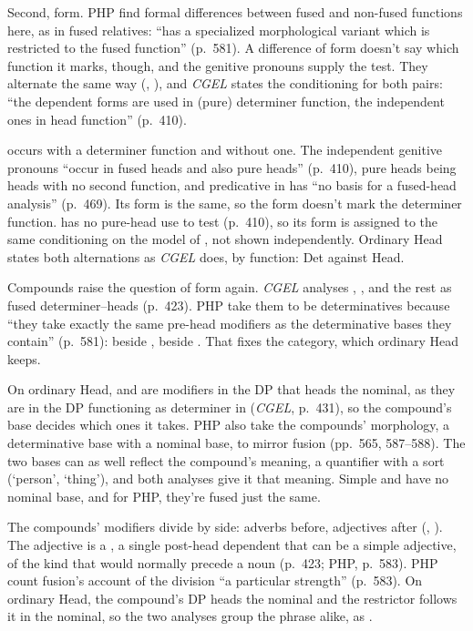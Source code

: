 Second, form. PHP find formal differences between fused and non-fused functions here, as in fused relatives:  \enquote{has a specialized morphological variant  which is restricted to the fused function} (p.~581). A difference of form doesn't say which function it marks, though, and the genitive pronouns supply the test. They alternate the same way (, ), and \textit{CGEL} states the conditioning for both pairs: \enquote{the dependent forms are used in (pure) determiner function, the independent ones in head function} (p.~410).

 occurs with a determiner function and without one. The independent genitive pronouns \enquote{occur in fused heads and also pure heads} (p.~410), pure heads being heads with no second function, and predicative  in  has \enquote{no basis for a fused-head analysis} (p.~469). Its form is the same, so the form doesn't mark the determiner function.  has no pure-head use to test (p.~410), so its form is assigned to the same conditioning on the model of , not shown independently. Ordinary Head states both alternations as \textit{CGEL} does, by function: Det against Head.

Compounds raise the question of form again. \textit{CGEL} analyses , , and the rest as fused determiner--heads (p.~423). PHP take them to be determinatives because \enquote{they take exactly the same pre-head modifiers as the determinative bases they contain} (p.~581):  beside ,  beside . That fixes the category, which ordinary Head keeps.

On ordinary Head,  and  are modifiers in the DP that heads the nominal, as they are in the DP functioning as determiner in  (\textit{CGEL}, p.~431), so the compound's base decides which ones it takes. PHP also take the compounds' morphology, a determinative base with a nominal base, to mirror fusion (pp.~565, 587--588). The two bases can as well reflect the compound's meaning, a quantifier with a sort (\enquote*{person}, \enquote*{thing}), and both analyses give it that meaning. Simple  and  have no nominal base, and for PHP, they're fused just the same.

The compounds' modifiers divide by side: adverbs before, adjectives after (, ). The adjective is a , a single post-head dependent that can be a simple adjective, of the kind that would normally precede a noun (p.~423; PHP, p.~583). PHP count fusion's account of the division \enquote{a particular strength} (p.~583). On ordinary Head, the compound's DP heads the nominal and the restrictor follows it in the nominal, so the two analyses group the phrase alike, as .

